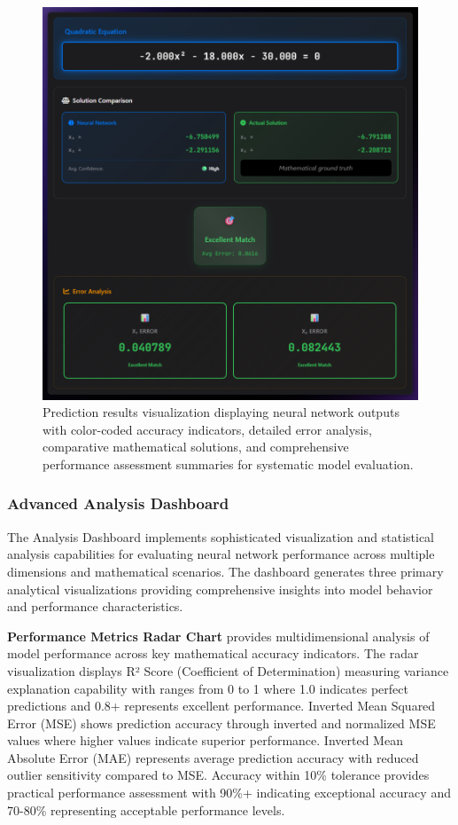 \documentclass[11pt,a4paper]{report}
\begin{document}
\begin{figure}[H]
\centering
\includegraphics[width=\textwidth]{quadratic_predictor_prediction_results.png}
\caption{Prediction results visualization displaying neural network outputs with color-coded accuracy indicators, detailed error analysis, comparative mathematical solutions, and comprehensive performance assessment summaries for systematic model evaluation.}
\label{fig:quadratic_prediction_results}
\end{figure}

\subsubsection{Advanced Analysis Dashboard}

The Analysis Dashboard implements sophisticated visualization and statistical analysis capabilities for evaluating neural network performance across multiple dimensions and mathematical scenarios. The dashboard generates three primary analytical visualizations providing comprehensive insights into model behavior and performance characteristics.

\textbf{Performance Metrics Radar Chart} provides multidimensional analysis of model performance across key mathematical accuracy indicators. The radar visualization displays R² Score (Coefficient of Determination) measuring variance explanation capability with ranges from 0 to 1 where 1.0 indicates perfect predictions and 0.8+ represents excellent performance. Inverted Mean Squared Error (MSE) shows prediction accuracy through inverted and normalized MSE values where higher values indicate superior performance. Inverted Mean Absolute Error (MAE) represents average prediction accuracy with reduced outlier sensitivity compared to MSE. Accuracy within 10\% tolerance provides practical performance assessment with 90\%+ indicating exceptional accuracy and 70-80\% representing acceptable performance levels.
\end{document}

